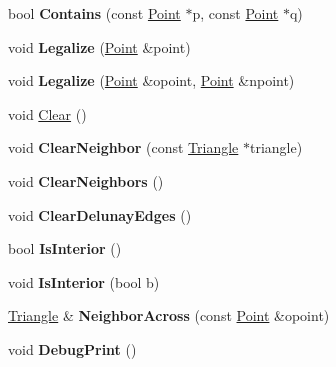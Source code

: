 \begin{DoxyCompactItemize}
bool {\bfseries Contains} (const \hyperlink{structp2t_1_1Point}{Point} $\ast$p, const \hyperlink{structp2t_1_1Point}{Point} $\ast$q)
\item 
\mbox{\label{classp2t_1_1Triangle_a3dcb2db468072495f8f287a749e3cf2a}} 
void {\bfseries Legalize} (\hyperlink{structp2t_1_1Point}{Point} \&point)
\item 
\mbox{\label{classp2t_1_1Triangle_ac1c464e079f8c373717640e70a10cba9}} 
void {\bfseries Legalize} (\hyperlink{structp2t_1_1Point}{Point} \&opoint, \hyperlink{structp2t_1_1Point}{Point} \&npoint)
\item 
void \hyperlink{classp2t_1_1Triangle_ad09dfbf0bc0917e4f0b32ffa735f5e6f}{Clear} ()
\item 
\mbox{\label{classp2t_1_1Triangle_a011fd7c02ffdac5acfc719174c4594db}} 
void {\bfseries Clear\+Neighbor} (const \hyperlink{classp2t_1_1Triangle}{Triangle} $\ast$triangle)
\item 
\mbox{\label{classp2t_1_1Triangle_aae3687cbc5c1b3e4964b3072ab97c463}} 
void {\bfseries Clear\+Neighbors} ()
\item 
\mbox{\label{classp2t_1_1Triangle_a435c14700eca2bee3c0e91ad8de051d8}} 
void {\bfseries Clear\+Delunay\+Edges} ()
\item 
\mbox{\label{classp2t_1_1Triangle_a9aaa9ee5f2184be6ffe64fe05b037233}} 
bool {\bfseries Is\+Interior} ()
\item 
\mbox{\label{classp2t_1_1Triangle_a6b39c78063b3af04d8cc156f4d4758c4}} 
void {\bfseries Is\+Interior} (bool b)
\item 
\mbox{\label{classp2t_1_1Triangle_ac11651bee7505d98b90dfd06da4ee8bc}} 
\hyperlink{classp2t_1_1Triangle}{Triangle} \& {\bfseries Neighbor\+Across} (const \hyperlink{structp2t_1_1Point}{Point} \&opoint)
\item 
\mbox{\label{classp2t_1_1Triangle_aeca5d9dadee27b9038618be9e450d030}} 
void {\bfseries Debug\+Print} ()
\end{DoxyCompactItemize}

